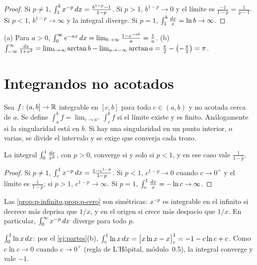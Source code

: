 \begin{proof}
Si $p\neq1$, $\int_1^{b}x^{-p}\mathop{}\!d x=\frac{b^{1-p}-1}{1-p}$. Si $p>1$, $b^{1-p}\to0$ y el límite es $\frac{-1}{1-p}=\frac{1}{p-1}$. Si $p<1$, $b^{1-p}\to\infty$ y la integral diverge. Si $p=1$, $\int_1^{b}\frac{\mathop{}\!d x}{x}=\ln b\to\infty$.
\end{proof}

\begin{ejemplo}\label{ej:impropias1}
(a) Para $a>0$, $\int_0^{\infty}e^{-ax}\mathop{}\!d x=\lim_{b\to\infty}\frac{1-e^{-ab}}{a}=\frac1a$.
(b) $\int_{-\infty}^{\infty}\frac{\mathop{}\!d x}{1+x^{2}}=\lim_{b\to\infty}\arctan b-\lim_{a\to-\infty}\arctan a=\frac\pi2-\bigl(-\frac\pi2\bigr)=\pi$.
\end{ejemplo}

\section{Integrandos no acotados}

\begin{definicion}\label{def:impropia2}
Sea $f\colon(a,b]\to\mathbb{R}$ integrable en $[c,b]$ para todo $c\in(a,b)$ y no acotada cerca de $a$. Se define $\int_a^{b}f=\lim_{c\to a^{+}}\int_c^{b}f$ si el límite existe y es finito. Análogamente si la singularidad está en $b$. Si hay una singularidad en un punto interior, o varias, se divide el intervalo y se exige que converja cada trozo.
\end{definicion}

\begin{proposicion}\label{prop:p-cero}
La integral $\int_0^{1}\frac{\mathop{}\!d x}{x^{p}}$, con $p>0$, converge si y solo si $p<1$, y en ese caso vale $\frac{1}{1-p}$.
\end{proposicion}

\begin{proof}
Si $p\neq1$, $\int_c^{1}x^{-p}\mathop{}\!d x=\frac{1-c^{1-p}}{1-p}$. Si $p<1$, $c^{1-p}\to0$ cuando $c\to0^{+}$ y el límite es $\frac{1}{1-p}$; si $p>1$, $c^{1-p}\to\infty$. Si $p=1$, $\int_c^{1}\frac{\mathop{}\!d x}{x}=-\ln c\to\infty$.
\end{proof}

Las \cref{prop:p-infinito,prop:p-cero} son simétricas: $x^{-p}$ es integrable en el infinito si decrece más deprisa que $1/x$, y en el origen si crece más despacio que $1/x$. En particular, $\int_0^{\infty}x^{-p}\mathop{}\!d x$ diverge para todo $p$.

\begin{ejemplo}\label{ej:log-impropia}
$\int_0^{1}\ln x\mathop{}\!d x$: por el \cref{ej:partes}(b), $\int_c^{1}\ln x\mathop{}\!d x=\bigl[x\ln x-x\bigr]_{c}^{1}=-1-c\ln c+c$. Como $c\ln c\to0$ cuando $c\to0^{+}$ (regla de L'Hôpital, módulo~0.5), la integral converge y vale $-1$.
\end{ejemplo}


